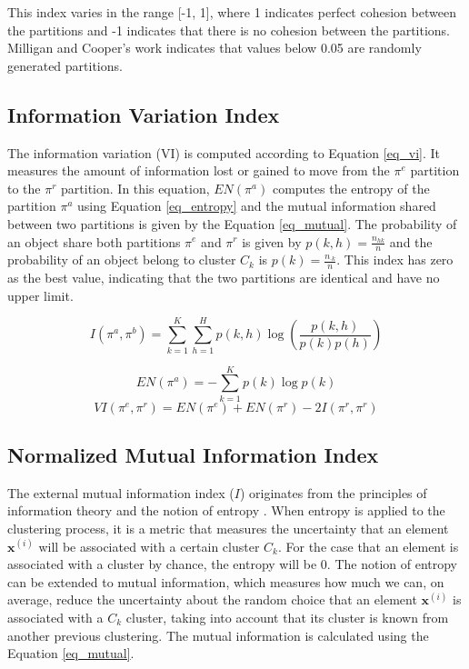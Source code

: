 This index varies in the range [-1, 1], where 1 indicates perfect cohesion between the partitions and -1 indicates that there is no cohesion between the partitions. Milligan and Cooper's work \cite{Milligan1986} indicates that values below 0.05 are randomly generated partitions.

\subsection{Information Variation Index}

The information variation (VI) \cite{carvalho2011inteligencia} is computed according to Equation \ref{eq_vi}. It measures the amount of information lost or gained to move from the $\pi^e$ partition to the $\pi^r$ partition. In this equation, $EN(\pi^a)$ computes the entropy of the partition $\pi^a$ using Equation \ref{eq_entropy} and the mutual information shared between two partitions is given by the Equation \ref{eq_mutual}. The probability of an object share both partitions $\pi^e$ and $\pi^r$ is given by $p(k,h)=\frac{n_{hk}}{n}$ and the probability of an object belong to cluster $C_k$ is $p(k)=\frac{n_{\cdot k}}{n}$. This index has zero as the best value, indicating that the two partitions are identical and have no upper limit.

\begin{equation}
\label{eq_mutual}
I(\pi^a,\pi^b)=\sum_{k=1}^K \sum_{h=1}^H p(k,h) \log\left(\frac{p(k,h)}{p(k)p(h)} \right)
\end{equation}

\begin{equation}
\label{eq_entropy}
EN(\pi^a)=-\sum_{k=1}^K p(k) \log p(k)
\end{equation}
\begin{equation}
\label{eq_vi}
VI(\pi^e,\pi^r)=EN(\pi^e)+EN(\pi^r)-2I(\pi^r,\pi^r)
\end{equation}

\subsection{Normalized Mutual Information Index}
The external mutual information index ($I$) originates from the principles of information theory and the notion of entropy \cite{Cover2006}. When entropy is applied to the clustering process, it is a metric that measures the uncertainty that an element $\mathbf{x}^{(i)}$ will be associated with a certain cluster $C_k$. For the case that an element is associated with a cluster by chance, the entropy will be 0. The notion of entropy can be extended to mutual information, which measures how much we can, on average, reduce the uncertainty about the random choice that an element $\mathbf{x}^{(i)}$ is associated with a $C_k$ cluster, taking into account that its cluster is known from another previous clustering. The mutual information is calculated using the Equation \eqref{eq_mutual}.

